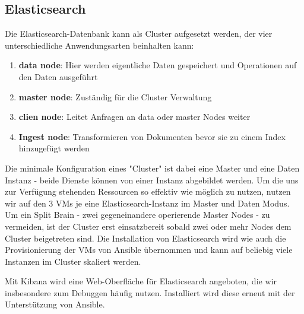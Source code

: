 \subsection{Elasticsearch}
Die Elasticsearch-Datenbank kann als Cluster aufgesetzt werden, der vier unterschiedliche Anwendungsarten beinhalten kann:
\begin{enumerate}
        \item \textbf{data node}: Hier werden eigentliche Daten gespeichert und Operationen auf den Daten ausgeführt
        \item \textbf{master node}: Zuständig für die Cluster Verwaltung
        \item \textbf{clien node}: Leitet Anfragen an data oder master Nodes weiter
        \item \textbf{Ingest node}: Transformieren von Dokumenten bevor sie zu einem Index hinzugefügt werden
\end{enumerate}
Die minimale Konfiguration eines "Cluster" ist dabei eine Master und eine Daten Instanz - beide Dienste können von einer Instanz abgebildet werden.
Um die uns zur Verfügung stehenden Ressourcen so effektiv wie möglich zu nutzen, nutzen wir auf den 3 VMs je eine Elasticsearch-Instanz im Master und Daten Modus.
Um ein Split Brain - zwei gegeneinandere operierende Master Nodes - zu vermeiden, ist der Cluster erst einsatzbereit sobald zwei oder mehr Nodes dem Cluster beigetreten sind.
Die Installation von Elasticsearch wird wie auch die Provisionierung der VMs von Ansible übernommen und kann auf beliebig viele Instanzen im Cluster skaliert werden.

Mit Kibana wird eine Web-Oberfläche für Elasticsearch angeboten, die wir insbesondere zum Debuggen häufig nutzen. Installiert wird diese erneut mit der Unterstützung von Ansible.

